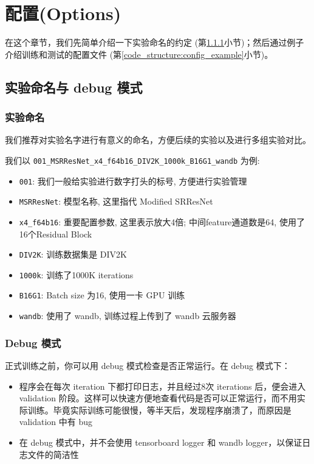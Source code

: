 \documentclass[../main.tex]{subfiles}
\begin{document}
\section{配置(Options)}\label{code_structure:config}

在这个章节，我们先简单介绍一下实验命名的约定 (第\ref{code_structure:name_convention}小节)；然后通过例子介绍训练和测试的配置文件 (第\ref{code_structure:config_example}小节)。

\subsection{实验命名与 debug 模式}\label{code_structure:name_convention_debug}

\subsubsection{实验命名}\label{code_structure:name_convention}

我们推荐对实验名字进行有意义的命名，方便后续的实验以及进行多组实验对比。

我们以 \texttt{001\_MSRResNet\_x4\_f64b16\_DIV2K\_1000k\_B16G1\_wandb} 为例:

\begin{itemize}
    \item \texttt{001}: 我们一般给实验进行数字打头的标号, 方便进行实验管理
    \item \texttt{MSRResNet}: 模型名称, 这里指代 Modified SRResNet
    \item \texttt{x4\_f64b16}: 重要配置参数, 这里表示放大4倍; 中间feature通道数是64, 使用了16个Residual Block
    \item \texttt{DIV2K}: 训练数据集是 DIV2K
    \item \texttt{1000k}: 训练了1000K iterations
    \item \texttt{B16G1}: Batch size 为16, 使用一卡 GPU 训练
    \item \texttt{wandb}: 使用了 wandb, 训练过程上传到了 wandb 云服务器
\end{itemize}

\subsubsection{Debug 模式}\label{code_structure:debug_mode}

正式训练之前，你可以用 debug 模式检查是否正常运行。在 debug 模式下：
\begin{itemize}
    \item 程序会在每次 iteration 下都打印日志，并且经过8次 iterations 后，便会进入 validation 阶段。这样可以快速方便地查看代码是否可以正常运行，而不用实际训练。毕竟实际训练可能很慢，等半天后，发现程序崩溃了，而原因是 validation 中有 bug
    \item 在 debug 模式中，并不会使用 tensorboard logger 和 wandb logger，以保证日志文件的简洁性
\end{itemize}
\end{document}
